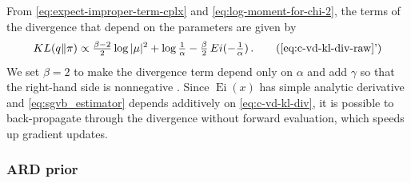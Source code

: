 \documentclass[a4paper,10pt,twocolumn]{article}
\newcommand{\cplx}{\mathbb{C}}
\begin{document}
From \eqref{eq:expect-improper-term-cplx} and \eqref{eq:log-moment-for-chi-2}, the terms of
the divergence that depend on the parameters are given by
\begin{equation}  \label{eq:c-vd-kl-div}
  KL(q\| \pi)
    \propto
      \tfrac{\beta-2}2 \log{\lvert \mu \rvert^2}
      + \log{\tfrac1{\alpha}}
      - \tfrac{\beta}2 \mathop{Ei}(- \tfrac1{\alpha})
      \,.
      \tag{\ref{eq:c-vd-kl-div-raw}'}
\end{equation}
We set $\beta = 2$ to make the divergence term depend only on $\alpha$ and add $\gamma$
so that the right-hand side is nonnegative \citep[eq.(84)]{lapidoth_capacity_2003}.
%
Since $\mathop{Ei}(x)$ has simple analytic derivative and \eqref{eq:sgvb_estimator} depends additively
on \eqref{eq:c-vd-kl-div}, it is possible to back-propagate through the divergence without
forward evaluation, which speeds up gradient updates.


\subsubsection{ARD prior} %
\label{ssub:ard_prior}
\end{document}
